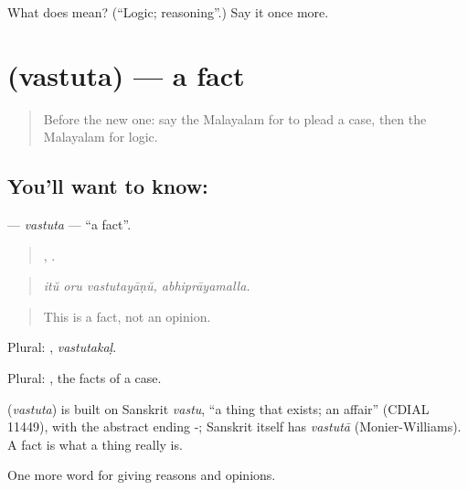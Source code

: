 \begin{tcolorbox}[breakable,colback=teal!4,colframe=teal!35!black,title={Before you move on}]
What does  mean? (\textquotedblleft{}Logic; reasoning\textquotedblright{}.) Say it once more.
\end{tcolorbox}
\section[\texorpdfstring{\ml{വസ്തുത} (vastuta)}{വസ്തുത (vastuta)}]{ (vastuta) — a fact}

\label{lesson:ML-C405-vastuta}



\begin{quote}
Before the new one: say the Malayalam for to plead a case, then the Malayalam for logic.
\end{quote}

\subsection*{You'll want to know: }
\textbf{} — \emph{vastuta} — \textquotedblleft{}a fact\textquotedblright{}.

\begin{quote}
  , .
\end{quote}

\begin{quote}
\emph{itŭ oru vastutayāṇŭ, abhiprāyamalla.}
\end{quote}

\begin{quote}
This is a fact, not an opinion.
\end{quote}

Plural: , \emph{vastutakaḷ}.

Plural: , the facts of a case.

\begin{cousinweb}
\textbf{} (\emph{vastuta}) is built on Sanskrit \emph{vastu}, \textquotedblleft{}a thing that exists; an affair\textquotedblright{} (CDIAL 11449), with the abstract ending -; Sanskrit itself has \emph{vastutā} (Monier-Williams). A fact is what a thing really is.
\end{cousinweb}

\begin{grammarlens}[title={What you've built}]
One more word for giving reasons and opinions.
\end{grammarlens}

